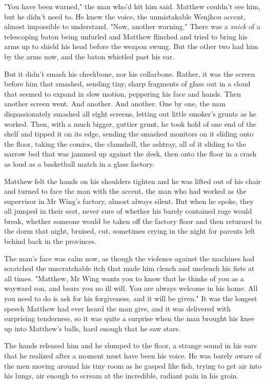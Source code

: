 "You have been warned," the man who'd hit him said. Matthew
couldn't see him, but he didn't need to. He knew the voice, the
unmistakable Wenjhou accent, almost impossible to understand. "Now,
another warning." There was a \emph{snick} of a telescoping baton
being unfurled and Matthew flinched and tried to bring his arms up
to shield his head before the weapon swung. But the other two had
him by the arms now, and the baton whistled past his ear.

But it didn't smash his cheekbone, nor his collarbone. Rather, it
was the screen before him that smashed, sending tiny, sharp
fragments of glass out in a cloud that seemed to expand in slow
motion, peppering his face and hands. Then another screen went. And
another. And another. One by one, the man dispassionately smashed
all eight screens, letting out little smoker's grunts as he worked.
Then, with a much bigger, guttier grunt, he took hold of one end of
the shelf and tipped it on its edge, sending the smashed monitors
on it sliding onto the floor, taking the comics, the clamshell, the
ashtray, all of it sliding to the narrow bed that was jammed up
against the desk, then onto the floor in a crash as loud as a
basketball match in a glass factory.

Matthew felt the hands on his shoulders tighten and he was lifted
out of his chair and turned to face the man with the accent, the
man who had worked as the supervisor in Mr Wing's factory, almost
always silent. But when he spoke, they all jumped in their seat,
never sure of whether his barely contained rage would break,
whether someone would be taken off the factory floor and then
returned to the dorm that night, bruised, cut, sometimes crying in
the night for parents left behind back in the provinces.

The man's face was calm now, as though the violence against the
machines had scratched the unscratchable itch that made him clench
and unclench his fists at all times. "Matthew, Mr Wing wants you to
know that he thinks of you as a wayward son, and bears you no ill
will. You are always welcome in his home. All you need to do is ask
for his forgiveness, and it will be given." It was the longest
speech Matthew had ever heard the man give, and it was delivered
with surprising tenderness, so it was quite a surprise when the man
brought his knee up into Matthew's balls, hard enough that he saw
stars.

The hands released him and he slumped to the floor, a strange sound
in his ears that he realized after a moment must have been his
voice. He was barely aware of the men moving around his tiny room
as he gasped like fish, trying to get air into his lungs, air
enough to scream at the incredible, radiant pain in his groin.

